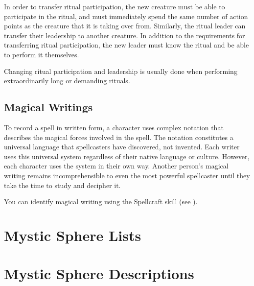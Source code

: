             In order to transfer ritual participation, the new creature must be able to participate in the ritual, and must immediately spend the same number of action points as the creature that it is taking over from.
            Similarly, the ritual leader can transfer their leadership to another creature.
            In addition to the requirements for transferring ritual participation, the new leader must know the ritual and be able to perform it themselves.

            Changing ritual participation and leadership is usually done when performing extraordinarily long or demanding rituals.

    \subsection{Magical Writings}
        To record a spell in written form, a character uses complex notation that describes the magical forces involved in the spell.
        The notation constitutes a universal language that spellcasters have discovered, not invented.
        Each writer uses this universal system regardless of their native language or culture.
        However, each character uses the system in their own way.
        Another person's magical writing remains incomprehensible to even the most powerful spellcaster until they take the time to study and decipher it.

        You can identify magical writing using the Spellcraft skill (see ).


\section{Mystic Sphere Lists}\label{Mystic Sphere Lists}

    

\section{Mystic Sphere Descriptions}\label{Mystic Sphere Descriptions}

    
